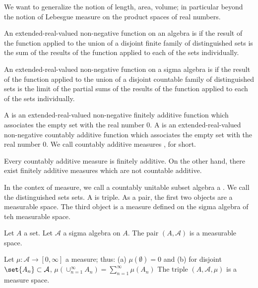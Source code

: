 
\sbasic



\sstart



We want to generalize the notion
of length, area, volume; in particular
beyond the notion of Lebesgue measure
on the product spaces of real numbers.


An extended-real-valued non-negative
function on an algebra is
if the result of the function applied to
the union of a disjoint finite family of
distinguished sets is the sum of the
results of the function applied to each
of the sets individually.

An extended-real-valued non-negative
function on a sigma algebra is
if the result of the function applied to
the union of a disjoint countable family of
distinguished sets is the limit of the partial
sums of the results of the function applied
to each of the sets individually.

A
is an extended-real-valued non-negative
finitely additive function which associates the empty
set with the real number $0$.
A
is an extended-real-valued non-negative
countably additive function which associates the empty
set with the real number $0$.
We call countably additive measures
, for short.

Every countably additive measure is finitely additive.
On the other hand, there exist finitely additive measures
which are not countable additive.

In the contex of measure,
we call a countably unitable subset algebra
a .
We call the distinguished sets
sets.
A
is triple.
As a pair, the first two
objects are a measurable space.
The third object is a measure defined
on the sigma algebra of teh measurable space.


Let $A$ a set.
Let $\mathcal{A}$ a sigma algebra on $A$.
The pair $(A, \mathcal{A})$ is a measurable space.

Let $\mu: \mathcal{A} \to [0, \infty]$ a measure;
thus:
(a) $\mu(\emptyset) = 0$ and
(b) for disjoint $\set{A_n} \subset \mathcal{A}$,
$\mu(\cup_{n = 1}^{\infty} A_n)
  = \sum_{n = 1}^{\infty} \mu(A_n)$
The triple $(A, \mathcal{A}, \mu)$ is a
measure space.

